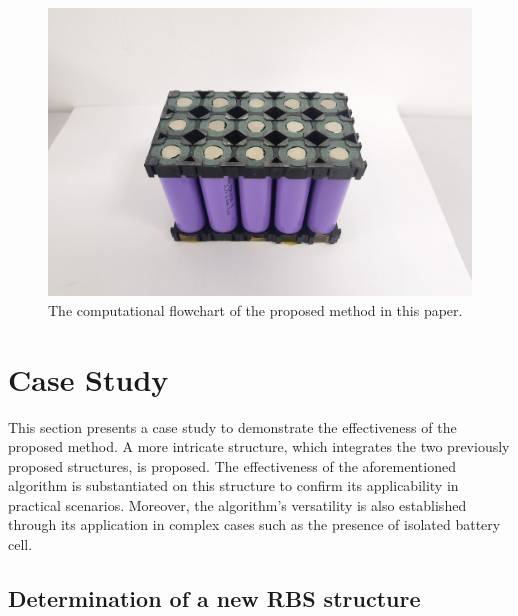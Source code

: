 \documentclass{article}
\begin{document}
\begin{figure}
    \centering
    \includegraphics[width=\textwidth]{../attachments/IMG_20230411_225909.jpg}
\caption{The computational flowchart of the proposed method in this paper.}\label{fig:flowchart}
\end{figure}
\section{Case Study}

This section presents a case study to demonstrate the effectiveness of the proposed method.
A more intricate structure, which integrates the two previously proposed structures, is proposed.
The effectiveness of the aforementioned algorithm is substantiated on this structure to confirm its applicability in practical scenarios.
Moreover, the algorithm's versatility is also established through its application in complex cases such as the presence of isolated battery cell.

\subsection{Determination of a new RBS structure}
\end{document}
